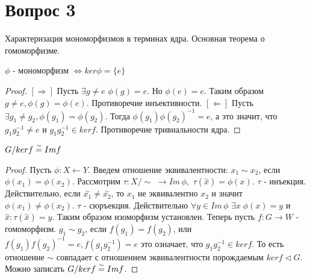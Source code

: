 \section{Вопрос 3}

Характеризация мономорфизмов в терминах ядра. Основная теорема о гомоморфизме.

\begin{thm}
$ \phi $ - мономорфизм $ \Leftrightarrow ker \phi = \{e\} $
\end{thm}
\begin{proof}
  $ [\Rightarrow] $ Пусть $ \exists g \ne e $ $ \phi(g) = e $. Но $ \phi(e) = e $. Таким образом $ g \ne e, \phi(g) = \phi(e) $. 
  Противоречие инъективности. \newline
  $ [\Leftarrow] $ Пусть $ \exists g_{1} \ne g_{2}, \phi(g_{1}) = \phi(g_{2}) $. Тогда $ \phi(g_{1})\phi(g_{2})^{-1} = e $,
  а это значит, что $ g_{1}g_{2}^{-1} \ne e $ и $ g_{1}g_{2}^{-1} \in ker f $. Противоречие тривиальности ядра. 
\end{proof}

\begin{thm}
  $ G/ker f \buildrel{\sim}\over{=} Im f $
\end{thm}
\begin{proof}
  Пусть $ \phi : X \leftarrow Y $. Введем отношение эквивалентности: $ x_1 \sim x_2 $, если $ \phi(x_1) = \phi(x_2) $. 
  Рассмотрим $ \tau : X/\!\!\!\sim  $ $ \rightarrow Im \, \phi, $ $ \tau(\overset\sim{x}) = \phi(x). $ \newline
  $ \tau $ - инъекция. Действительно, если $ \overset\sim{x_1} \ne \overset\sim{x_2} $, то $ x_1 $ не эквивалентно $ x_2 $
  и значит $ \phi(x_1) \ne \phi(x_2) $. \newline
  $ \tau $ - сюръекция. Действительно $ \forall y \in Im \, \phi $ $ \exists x \; \phi(x) = y $ и 
  $ \overset\sim{x} : \tau(\overset\sim{x}) = y $. Таким образом изоморфизм установлен. \newline
  Теперь пусть $ f : G \rightarrow W $ - гомоморфизм. $ g_1 \sim g_2 $, если $ f(g_1) = f(g_2) $, или 
  $ f(g_1)f(g_2)^{-1} = e, f(g_1g_2^{-1}) = e $ это означает, что $ g_1g_2^{-1} \in ker f $. То есть отношение $ \sim $
  совпадает с отношением эквивалентности порождаемым $ ker f \triangleleft G $. Можно записать
  $ G/ker f \buildrel{\sim}\over{=} Im f $.
\end{proof}



